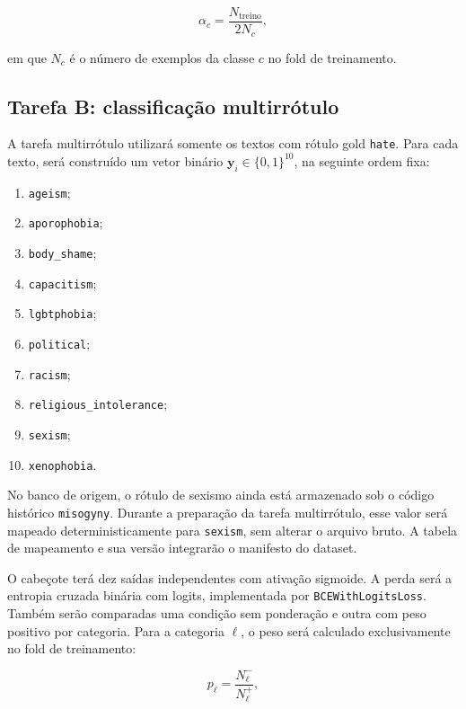 \begin{equation}
    \alpha_c = \frac{N_{\mathrm{treino}}}{2N_c},
\end{equation}

em que $N_c$ é o número de exemplos da classe $c$ no fold de treinamento.

\subsection{Tarefa B: classificação multirrótulo}
\label{sec:tarefa-multirrotulo}

A tarefa multirrótulo utilizará somente os textos com rótulo gold
\texttt{hate}. Para cada texto, será construído um vetor binário
$\mathbf{y}_i \in \{0,1\}^{10}$, na seguinte ordem fixa:

\begin{enumerate}
    \item \texttt{ageism};
    \item \texttt{aporophobia};
    \item \texttt{body\_shame};
    \item \texttt{capacitism};
    \item \texttt{lgbtphobia};
    \item \texttt{political};
    \item \texttt{racism};
    \item \texttt{religious\_intolerance};
    \item \texttt{sexism};
    \item \texttt{xenophobia}.
\end{enumerate}

No banco de origem, o rótulo de sexismo ainda está armazenado sob o código
histórico \texttt{misogyny}. Durante a preparação da tarefa multirrótulo, esse
valor será mapeado deterministicamente para \texttt{sexism}, sem alterar o
arquivo bruto. A tabela de mapeamento e sua versão integrarão o manifesto do
dataset.

O cabeçote terá dez saídas independentes com ativação sigmoide. A perda será a
entropia cruzada binária com logits, implementada por
\texttt{BCEWithLogitsLoss}. Também serão comparadas uma condição sem ponderação
e outra com peso positivo por categoria. Para a categoria $\ell$, o peso será
calculado exclusivamente no fold de treinamento:

\begin{equation}
    p_{\ell} = \frac{N_{\ell}^{-}}{N_{\ell}^{+}},
\end{equation}

